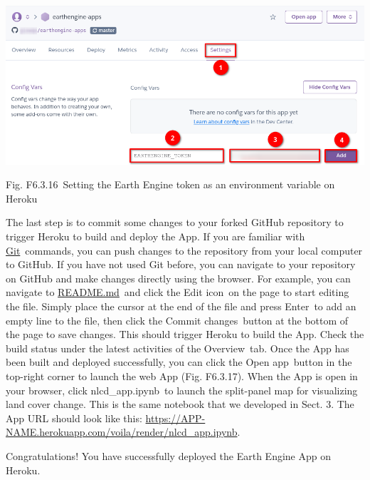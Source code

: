\documentclass[
  letterpaper,
  DIV=11,
  numbers=noendperiod]{scrreprt}
\begin{document}
\includegraphics{./F6/image4.png}

Fig. F6.3.16~Setting the Earth Engine token as an environment variable
on Heroku

The last step is to commit some changes to your forked GitHub repository
to trigger Heroku to build and deploy the App. If you are familiar with
\href{https://www.google.com/url?q=https://git-scm.com/book/en/v2/Getting-Started-Installing-Git\&sa=D\&source=editors\&ust=1671458841348079\&usg=AOvVaw0sqY5Rw_8XGKlIcdI82G_f}{Git}~commands,
you can push changes to the repository from your local computer to
GitHub. If you have not used Git before, you can navigate to your
repository on GitHub and make changes directly using the browser. For
example, you can navigate to
\href{https://www.google.com/url?q=https://github.com/giswqs/earthengine-apps/blob/master/README.md\&sa=D\&source=editors\&ust=1671458841348610\&usg=AOvVaw1JFdaBCpAIcitrc-P7DHhR}{README.md}~and
click the Edit icon~on the page to start editing the file. Simply place
the cursor at the end of the file and press Enter~to add an empty line
to the file, then click the Commit changes~button at the bottom of the
page to save changes. This should trigger Heroku to build the App. Check
the build status under the latest activities of the Overview~tab. Once
the App has been built and deployed successfully, you can click the Open
app~button in the top-right corner to launch the web App (Fig. F6.3.17).
When the App is open in your browser, click nlcd\_app.ipynb~to launch
the split-panel map for visualizing land cover change. This is the same
notebook that we developed in Sect. 3. The App URL should look like
this:
\href{https://www.google.com/url?q=https://app-name.herokuapp.com/voila/render/nlcd_app.ipynb\&sa=D\&source=editors\&ust=1671458841349532\&usg=AOvVaw2GAtxe9X-ymmUvBhjV_PBD}{https://APP-NAME.herokuapp.com/voila/render/nlcd\_app.ipynb}.

Congratulations! You have successfully deployed the Earth Engine App on
Heroku.
\end{document}
